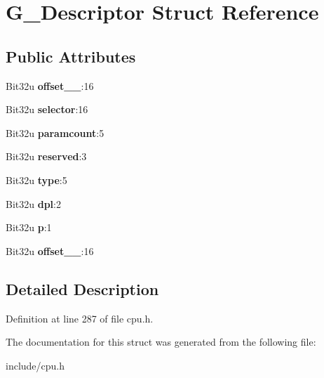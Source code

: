 \hypertarget{structG__Descriptor}{\section{G\-\_\-\-Descriptor Struct Reference}
\label{structG__Descriptor}
}
\subsection*{Public Attributes}
\begin{DoxyCompactItemize}
\item 
\hypertarget{structG__Descriptor_ae7eac20d4a45102dbdb5ff442af9360e}{Bit32u {\bfseries offset\-\_\-\_}\-:16}\label{structG__Descriptor_ae7eac20d4a45102dbdb5ff442af9360e}

\item 
\hypertarget{structG__Descriptor_a66f4c899b74dad2fab890f0fc7321f24}{Bit32u {\bfseries selector}\-:16}\label{structG__Descriptor_a66f4c899b74dad2fab890f0fc7321f24}

\item 
\hypertarget{structG__Descriptor_a5db5a0455afaf116c09459b3084909c0}{Bit32u {\bfseries paramcount}\-:5}\label{structG__Descriptor_a5db5a0455afaf116c09459b3084909c0}

\item 
\hypertarget{structG__Descriptor_aba2e9e4b05526b04e3af1eb955a9e54c}{Bit32u {\bfseries reserved}\-:3}\label{structG__Descriptor_aba2e9e4b05526b04e3af1eb955a9e54c}

\item 
\hypertarget{structG__Descriptor_abf15e89abb33521d5f7f73a6e0aba787}{Bit32u {\bfseries type}\-:5}\label{structG__Descriptor_abf15e89abb33521d5f7f73a6e0aba787}

\item 
\hypertarget{structG__Descriptor_a8d226fa69f85928cbec3302f4013eec0}{Bit32u {\bfseries dpl}\-:2}\label{structG__Descriptor_a8d226fa69f85928cbec3302f4013eec0}

\item 
\hypertarget{structG__Descriptor_a2119158ac5abf18fe9bad195df2a4513}{Bit32u {\bfseries p}\-:1}\label{structG__Descriptor_a2119158ac5abf18fe9bad195df2a4513}

\item 
\hypertarget{structG__Descriptor_a3361c144843af13dc5141a6759d98606}{Bit32u {\bfseries offset\-\_\-\_}\-:16}\label{structG__Descriptor_a3361c144843af13dc5141a6759d98606}

\end{DoxyCompactItemize}


\subsection{Detailed Description}


Definition at line 287 of file cpu.\-h.



The documentation for this struct was generated from the following file\-:\begin{DoxyCompactItemize}
\item 
include/cpu.\-h\end{DoxyCompactItemize}
